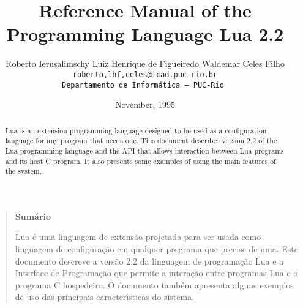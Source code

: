 
\newcommand{\rw}[1]{{\bf #1}}
\newcommand{\see}[1]{see Section~\ref{#1}}
\newcommand{\nil}{{\bf nil}}
\newcommand{\Line}{\rule{\linewidth}{.5mm}}
\def\tecgraf{{\sf TeC\kern-.21em\lower.7ex\hbox{Graf}}}

\newcommand{\Index}[1]{#1\index{#1}}
\newcommand{\IndexVerb}[1]{{\tt #1}\index{#1}}
\newcommand{\Def}[1]{{\em #1}\index{#1}}
\newcommand{\Deffunc}[1]{\index{{\tt #1}}}





\title{Reference Manual of the Programming Language Lua 2.2}

\author{%
Roberto Ierusalimschy\quad
Luiz Henrique de Figueiredo\quad
Waldemar Celes Filho
\vspace{1.0ex}\\
\smallskip
\small\tt roberto,lhf,celes@icad.puc-rio.br
\vspace{2.0ex}\\
Departamento de Inform\'atica --- PUC-Rio
}

\date{November, 1995}

\maketitle


\begin{abstract}
\noindent
Lua is an extension programming language designed to be used
as a configuration language for any program that needs one.
This document describes version 2.2 of the Lua programming language and the
API that allows interaction between Lua programs and its host C program.
It also presents some examples of using the main features of the system.
\end{abstract}

\vspace{4ex}
\begin{quotation}
\small
\begin{center}{\bf Sum\'ario}\end{center}
\vspace{1ex}
\noindent
Lua \'e uma linguagem de extens\~ao projetada para ser usada como
linguagem de configura\c{c}\~ao em qualquer programa que precise de
uma.
Este documento descreve a vers\~ao 2.2 da linguagem de programa\c{c}\~ao Lua e a
Interface de Programa\c{c}\~ao que permite a intera\c{c}\~ao entre programas Lua
e o programa C hospedeiro.
O documento tamb\'em apresenta alguns exemplos de uso das principais
ca\-racte\-r\'{\i}sticas do sistema.
\end{quotation}


